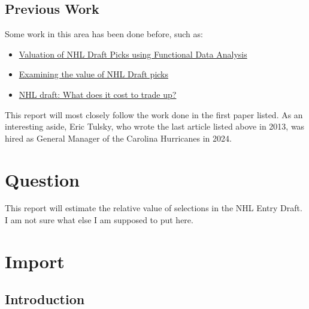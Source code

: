 \documentclass[
  letterpaper,
  DIV=11,
  numbers=noendperiod]{scrreprt}
\begin{document}
\section{Previous Work}\label{previous-work}

Some work in this area has been done before, such as:

\begin{itemize}
\item
  \href{https://summit.sfu.ca/_flysystem/fedora/2023-02/etd22223.pdf}{Valuation
  of NHL Draft Picks using Functional Data Analysis}
\item
  \href{https://soundofhockey.com/2022/06/06/examining-the-value-of-nhl-draft-picks/amp/}{Examining
  the value of NHL Draft picks}
\item
  \href{https://www.broadstreethockey.com/post/nhl-draft-pick-value-trading-up/}{NHL
  draft: What does it cost to trade up?}
\end{itemize}

This report will most closely follow the work done in the first paper
listed. As an interesting aside, Eric Tulsky, who wrote the last article
listed above in 2013, was hired as General Manager of the Carolina
Hurricanes in 2024.


\chapter{Question}\label{question}

This report will estimate the relative value of selections in the NHL
Entry Draft. I am not sure what else I am supposed to put here.


\chapter{Import}\label{import}

\section{Introduction}\label{introduction}
\end{document}
